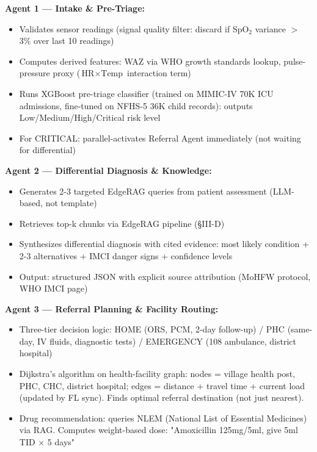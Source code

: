 \documentclass[conference,compsoc]{IEEEtran}
\begin{document}
\textbf{Agent 1 — Intake \& Pre-Triage:}
\begin{itemize}
    \item Validates sensor readings (signal quality filter: discard if SpO\(_2\) variance \(>\) 3\% over last 10 readings)
    \item Computes derived features: WAZ via WHO growth standards lookup, pulse-pressure proxy (\(\text{HR} \times \text{Temp}\) interaction term)
    \item Runs XGBoost pre-triage classifier (trained on MIMIC-IV 70K ICU admissions, fine-tuned on NFHS-5 36K child records): outputs Low/Medium/High/Critical risk level
    \item For CRITICAL: parallel-activates Referral Agent immediately (not waiting for differential)
\end{itemize}

\textbf{Agent 2 — Differential Diagnosis \& Knowledge:}
\begin{itemize}
    \item Generates 2-3 targeted EdgeRAG queries from patient assessment (LLM-based, not template)
    \item Retrieves top-k chunks via EdgeRAG pipeline (§III-D)
    \item Synthesizes differential diagnosis with cited evidence: most likely condition + 2-3 alternatives + IMCI danger signs + confidence levels
    \item Output: structured JSON with explicit source attribution (MoHFW protocol, WHO IMCI page)
\end{itemize}

\textbf{Agent 3 — Referral Planning \& Facility Routing:}
\begin{itemize}
    \item Three-tier decision logic: HOME (ORS, PCM, 2-day follow-up) / PHC (same-day, IV fluids, diagnostic tests) / EMERGENCY (108 ambulance, district hospital)
    \item Dijkstra's algorithm on health-facility graph: nodes = village health post, PHC, CHC, district hospital; edges = distance + travel time + current load (updated by FL sync). Finds optimal referral destination (not just nearest).
    \item Drug recommendation: queries NLEM (National List of Essential Medicines) via RAG. Computes weight-based dose: "Amoxicillin 125mg/5ml, give 5ml TID × 5 days"
\end{itemize}
\end{document}
